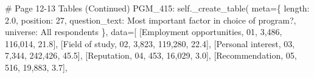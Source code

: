 \documentclass[
  11pt,
  a4paper,
]{article}
\newenvironment{Shaded}{\begin{snugshade}}{\end{snugshade}}
\newcommand{\CommentTok}[1]{\textcolor[rgb]{0.37,0.37,0.37}{#1}}
\newcommand{\NormalTok}[1]{\textcolor[rgb]{0.00,0.23,0.31}{#1}}
\newcommand{\OperatorTok}[1]{\textcolor[rgb]{0.37,0.37,0.37}{#1}}
\newcommand{\StringTok}[1]{\textcolor[rgb]{0.13,0.47,0.30}{#1}}
\newcommand{\VariableTok}[1]{\textcolor[rgb]{0.07,0.07,0.07}{#1}}
\begin{document}
\begin{Shaded}
\begin{Highlighting}[]
            \CommentTok{\# Page 12{-}13 Tables (Continued)}
            \StringTok{\textquotesingle{}PGM\_415\textquotesingle{}}\NormalTok{: }\VariableTok{self}\NormalTok{.\_create\_table(}
\NormalTok{                meta}\OperatorTok{=}\NormalTok{\{}
                    \StringTok{\textquotesingle{}length\textquotesingle{}}\NormalTok{: }\StringTok{\textquotesingle{}2.0\textquotesingle{}}\NormalTok{, }\StringTok{\textquotesingle{}position\textquotesingle{}}\NormalTok{: }\StringTok{\textquotesingle{}27\textquotesingle{}}\NormalTok{,}
                    \StringTok{\textquotesingle{}question\_text\textquotesingle{}}\NormalTok{: }\StringTok{\textquotesingle{}Most important factor in choice of program?\textquotesingle{}}\NormalTok{,}
                    \StringTok{\textquotesingle{}universe\textquotesingle{}}\NormalTok{: }\StringTok{\textquotesingle{}All respondents\textquotesingle{}}
\NormalTok{                \},}
\NormalTok{                data}\OperatorTok{=}\NormalTok{[}
\NormalTok{                    [}\StringTok{\textquotesingle{}Employment opportunities\textquotesingle{}}\NormalTok{, }\StringTok{\textquotesingle{}01\textquotesingle{}}\NormalTok{, }\StringTok{\textquotesingle{}3,486\textquotesingle{}}\NormalTok{, }\StringTok{\textquotesingle{}116,014\textquotesingle{}}\NormalTok{, }\StringTok{\textquotesingle{}21.8\textquotesingle{}}\NormalTok{],}
\NormalTok{                    [}\StringTok{\textquotesingle{}Field of study\textquotesingle{}}\NormalTok{, }\StringTok{\textquotesingle{}02\textquotesingle{}}\NormalTok{, }\StringTok{\textquotesingle{}3,823\textquotesingle{}}\NormalTok{, }\StringTok{\textquotesingle{}119,280\textquotesingle{}}\NormalTok{, }\StringTok{\textquotesingle{}22.4\textquotesingle{}}\NormalTok{],}
\NormalTok{                    [}\StringTok{\textquotesingle{}Personal interest\textquotesingle{}}\NormalTok{, }\StringTok{\textquotesingle{}03\textquotesingle{}}\NormalTok{, }\StringTok{\textquotesingle{}7,344\textquotesingle{}}\NormalTok{, }\StringTok{\textquotesingle{}242,426\textquotesingle{}}\NormalTok{, }\StringTok{\textquotesingle{}45.5\textquotesingle{}}\NormalTok{],}
\NormalTok{                    [}\StringTok{\textquotesingle{}Reputation\textquotesingle{}}\NormalTok{, }\StringTok{\textquotesingle{}04\textquotesingle{}}\NormalTok{, }\StringTok{\textquotesingle{}453\textquotesingle{}}\NormalTok{, }\StringTok{\textquotesingle{}16,029\textquotesingle{}}\NormalTok{, }\StringTok{\textquotesingle{}3.0\textquotesingle{}}\NormalTok{],}
\NormalTok{                    [}\StringTok{\textquotesingle{}Recommendation\textquotesingle{}}\NormalTok{, }\StringTok{\textquotesingle{}05\textquotesingle{}}\NormalTok{, }\StringTok{\textquotesingle{}516\textquotesingle{}}\NormalTok{, }\StringTok{\textquotesingle{}19,883\textquotesingle{}}\NormalTok{, }\StringTok{\textquotesingle{}3.7\textquotesingle{}}\NormalTok{],}

\end{Highlighting}
\end{Shaded}
\end{document}
